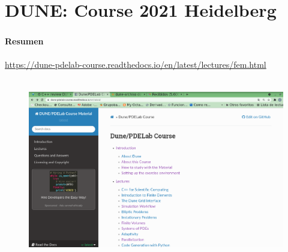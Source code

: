 \section{DUNE: Course 2021 Heidelberg}
\begin{frame}
	\frametitle{\secname}
	\framesubtitle{Resumen }
	\url{https://dune-pdelab-course.readthedocs.io/en/latest/lectures/fem.html}
	\begin{figure}[ht!]
		\centering
		\includegraphics[height=8cm, width=12cm]{dune_course_2021}
	\end{figure}
\end{frame}
{
\begin{frame}[plain]
\end{frame}
}


